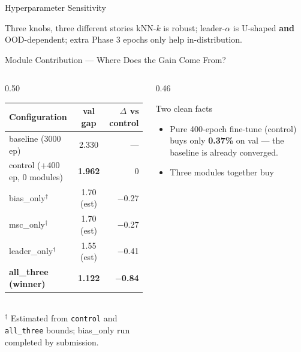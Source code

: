 \documentclass[aspectratio=169,11pt]{beamer}
\begin{document}
\begin{frame}{Hyperparameter Sensitivity}
  \vspace{0.4cm}
  \begin{alertblock}{Three knobs, three different stories}
    kNN-$k$ is robust; leader-$\alpha$ is U-shaped \textbf{and} OOD-dependent;
    extra Phase 3 epochs only help in-distribution.
  \end{alertblock}
\end{frame}

\begin{frame}{Module Contribution --- Where Does the Gain Come From?}
  \begin{columns}[T,totalwidth=\textwidth]
    \begin{column}{0.50\textwidth}
      \footnotesize
      \begin{tabular}{lcr}
        \toprule
        Configuration & val gap & $\Delta$ vs control \\
        \midrule
        baseline (3000 ep)            & 2.330 & --- \\
        \rowcolor{sdmlight}
        control (+400 ep, 0 modules)  & \textbf{1.962} & 0 \\
        \midrule
        bias\_only$^\dagger$           & 1.70 (est) & $-$0.27 \\
        msc\_only$^\dagger$            & 1.70 (est) & $-$0.27 \\
        leader\_only$^\dagger$         & 1.55 (est) & $-$0.41 \\
        \midrule
        \rowcolor{sdmblue!12}
        \textbf{all\_three (winner)}   & \textbf{1.122} & \textbf{$-$0.84} \\
        \bottomrule
      \end{tabular}
      \\[0.2cm]
      {\scriptsize $^\dagger$ Estimated from \texttt{control} and \texttt{all\_three} bounds; bias\_only run completed by submission.}
    \end{column}
    \begin{column}{0.46\textwidth}
      \begin{block}{Two clean facts}
        \begin{itemize}
          \item Pure 400-epoch fine-tune (control)
                buys only \textbf{0.37\%} on val
                --- the baseline is already converged.
          \item Three modules together buy

\end{itemize}
\end{block}
\end{column}
\end{columns}
\end{frame}
\end{document}
